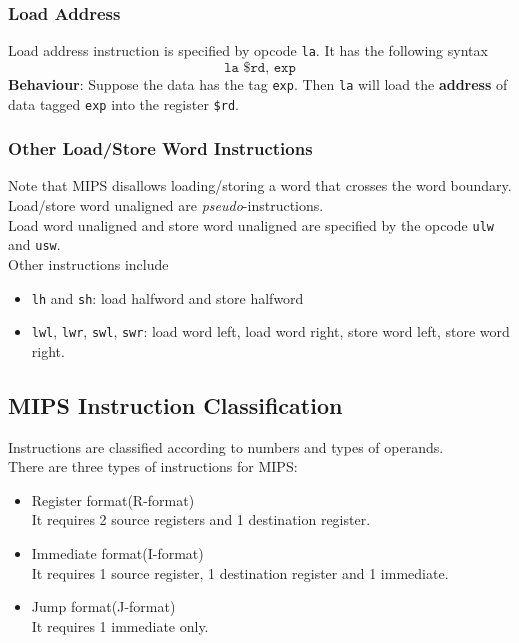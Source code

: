 \documentclass[12pt]{article}
\theoremstyle{definition}
\begin{document}
\subsubsection{Load Address}
Load address instruction is specified by opcode \texttt{la}. It has the following syntax
\[
\texttt{la \$rd, exp}
\]
\textbf{Behaviour}: Suppose the data has the tag \texttt{exp}. Then \texttt{la} will load the \textbf{address} of data tagged \texttt{exp} into the register \texttt{\$rd}.
\subsubsection{Other Load/Store Word Instructions}
Note that MIPS disallows loading/storing a word that crosses the word boundary. Load/store word unaligned are \textit{pseudo}-instructions.\\
Load word unaligned and store word unaligned are specified by the opcode \texttt{ulw} and \texttt{usw}.\\
Other instructions include
\begin{itemize}
  \item \texttt{lh} and \texttt{sh}: load halfword and store halfword
  \item \texttt{lwl}, \texttt{lwr}, \texttt{swl}, \texttt{swr}: load word left, load word right, store word left, store word right.
\end{itemize}
\subsection{MIPS Instruction Classification}
Instructions are classified according to numbers and types of operands. \\There are three types of instructions for MIPS:
\begin{itemize}
  \item Register format(R-format)\\It requires 2 source registers and 1 destination register.
  \item Immediate format(I-format)\\It requires 1 source register, 1 destination register and 1 immediate.
  \item Jump format(J-format)\\It requires 1 immediate only.
\end{itemize}
\end{document}
